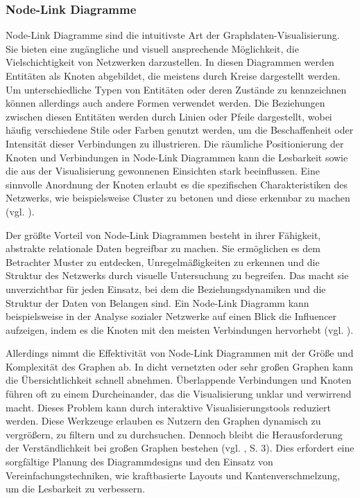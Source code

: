 \subsubsection{Node-Link Diagramme}

Node-Link Diagramme sind die intuitivste Art der Graphdaten-Visualisierung. Sie bieten eine zugängliche und visuell  ansprechende Möglichkeit, die Vielschichtigkeit von Netzwerken darzustellen. In diesen Diagrammen werden Entitäten als Knoten abgebildet, die meistens durch Kreise dargestellt werden. Um unterschiedliche Typen von Entitäten oder deren Zustände zu kennzeichnen können allerdings auch andere Formen verwendet werden. Die Beziehungen zwischen diesen Entitäten werden durch Linien oder Pfeile dargestellt, wobei häufig verschiedene Stile oder Farben genutzt werden, um die Beschaffenheit oder Intensität dieser Verbindungen zu illustrieren. Die räumliche Positionierung der Knoten und Verbindungen in Node-Link Diagrammen kann die Lesbarkeit sowie die aus der Visualisierung gewonnenen Einsichten stark beeinflussen. Eine sinnvolle Anordnung der Knoten erlaubt es die spezifischen Charakteristiken des Netzwerks, wie beispielsweise Cluster zu betonen und diese erkennbar zu machen (vgl. \cite{nodelink:Basics}).

Der größte Vorteil von Node-Link Diagrammen besteht in ihrer Fähigkeit, abstrakte relationale Daten begreifbar zu machen. Sie ermöglichen es dem Betrachter Muster zu entdecken, Unregelmäßigkeiten zu erkennen und die Struktur des Netzwerks durch visuelle Untersuchung zu begreifen. Das macht sie unverzichtbar für jeden Einsatz, bei dem die Beziehungsdynamiken und die Struktur der Daten von Belangen sind. Ein Node-Link Diagramm kann beispielsweise in der Analyse sozialer Netzwerke auf einen Blick die Influencer aufzeigen, indem es die Knoten mit den meisten Verbindungen hervorhebt (vgl. \cite{nodelink:Basics}).

Allerdings nimmt die Effektivität von Node-Link Diagrammen mit der Größe und Komplexität des Graphen ab. In dicht vernetzten oder sehr großen Graphen kann die Übersichtlichkeit schnell abnehmen. Überlappende Verbindungen und Knoten führen oft zu einem Durcheinander, das die Visualisierung unklar und verwirrend macht. Dieses Problem kann durch interaktive Visualisierungstools reduziert werden. Diese Werkzeuge erlauben es Nutzern den Graphen dynamisch zu vergrößern, zu filtern und zu durchsuchen. Dennoch bleibt die Herausforderung der Verständlichkeit bei großen Graphen bestehen (vgl. \cite{nodelink:DynamicGraph}, S. 3). Dies erfordert eine sorgfältige Planung des Diagrammdesigns und den Einsatz von Vereinfachungstechniken, wie kraftbasierte Layouts und Kantenverschmelzung, um die Lesbarkeit zu verbessern.

